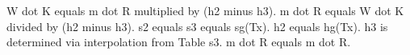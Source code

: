 W dot K equals m dot R multiplied by (h2 minus h3).  
m dot R equals W dot K divided by (h2 minus h3).  
s2 equals s3 equals sg(Tx).  
h2 equals hg(Tx).  
h3 is determined via interpolation from Table s3.  
m dot R equals m dot R.